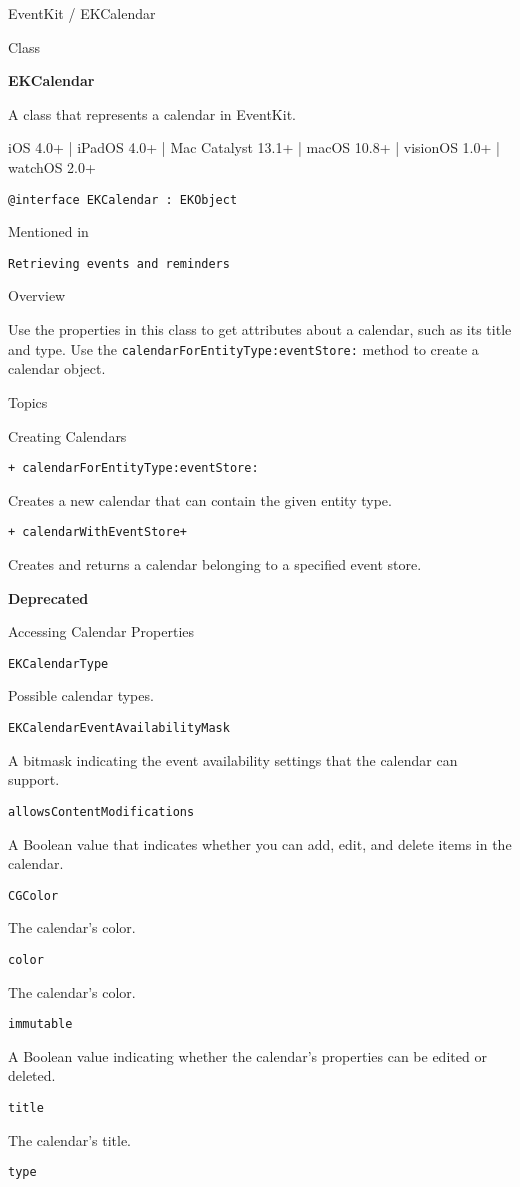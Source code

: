 \documentclass{article}
\title{}
\author{}
\date{}
\begin{document}
EventKit / EKCalendar

Class

\textbf{EKCalendar}

A class that represents a calendar in EventKit.

iOS 4.0+ | iPadOS 4.0+ | Mac Catalyst 13.1+ | macOS 10.8+ | visionOS 1.0+ | watchOS 2.0+

\texttt{@interface EKCalendar : EKObject}

Mentioned in

\texttt{Retrieving events and reminders}

Overview

Use the properties in this class to get attributes about a calendar, such as its title and type. Use the \texttt{calendarForEntityType:eventStore:} method to create a calendar object.

Topics

Creating Calendars

\texttt{+ calendarForEntityType:eventStore:}

Creates a new calendar that can contain the given entity type.

\texttt{+ calendarWithEventStore+}

Creates and returns a calendar belonging to a specified event store.

\textbf{Deprecated}

Accessing Calendar Properties

\texttt{EKCalendarType}

Possible calendar types.

\texttt{EKCalendarEventAvailabilityMask}

A bitmask indicating the event availability settings that the calendar can support.

\texttt{allowsContentModifications}

A Boolean value that indicates whether you can add, edit, and delete items in the calendar.

\texttt{CGColor}

The calendar's color.

\texttt{color}

The calendar's color.

\texttt{immutable}

A Boolean value indicating whether the calendar's properties can be edited or deleted.

\texttt{title}

The calendar's title.

\texttt{type}
\end{document}

